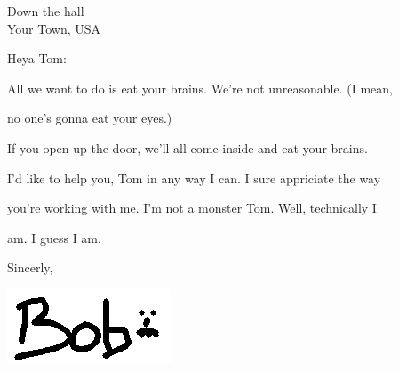 \documentclass{letter}
\begin{document}
\longindentation=0pt

\begin{letter}{  Down the hall \\ Your Town, USA }

\opening{  Heya Tom: }


All we want to do is eat your brains. We're not unreasonable. (I mean,

no one's gonna eat your eyes.)

If you open up the door, we'll all come inside and eat your brains.

I'd like to help you, Tom in any way I can. I sure appriciate the way

you're working with me. I'm not a monster Tom. Well, technically I

am. I guess I am.

\vspace{1 em}

\closing{Sincerly,}



\vspace{-.85in}
\includegraphics[scale=.4]{example/bob_sig.png}



\end{letter}
\end{document}
